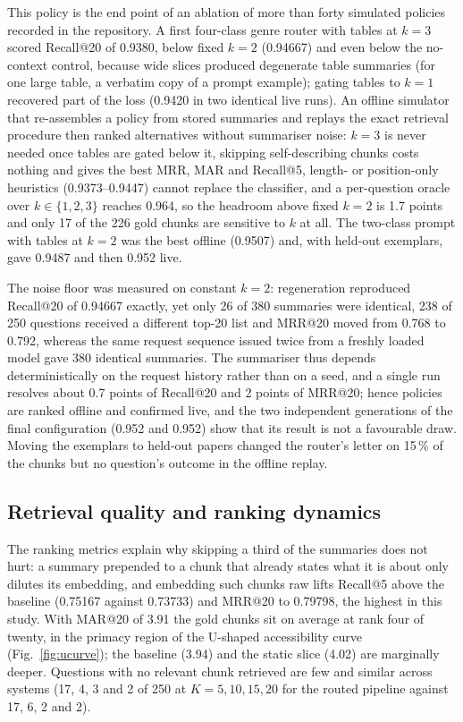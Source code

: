 \documentclass[pdflatex,sn-mathphys-num]{sn-jnl}
\makeatletter
\newcommand{\Rec}[1]{Recall@#1}
\newcommand{\MRR}[1]{MRR@#1}
\newcommand{\MAR}[1]{MAR@#1}
\theoremstyle{thmstyleone}%
\theoremstyle{thmstylethree}%
\makeatother
\begin{document}
This policy is the end point of an ablation of more than forty simulated policies recorded in the repository. A first four-class genre router with tables at $k=3$ scored \Rec{20} of 0.9380, below fixed $k=2$ (0.94667) and even below the no-context control, because wide slices produced degenerate table summaries (for one large table, a verbatim copy of a prompt example); gating tables to $k=1$ recovered part of the loss (0.9420 in two identical live runs). An offline simulator that re-assembles a policy from stored summaries and replays the exact retrieval procedure then ranked alternatives without summariser noise: $k=3$ is never needed once tables are gated below it, skipping self-describing chunks costs nothing and gives the best MRR, MAR and \Rec{5}, length- or position-only heuristics (0.9373--0.9447) cannot replace the classifier, and a per-question oracle over $k\in\{1,2,3\}$ reaches 0.964, so the headroom above fixed $k=2$ is 1.7 points and only 17 of the 226 gold chunks are sensitive to $k$ at all. The two-class prompt with tables at $k=2$ was the best offline (0.9507) and, with held-out exemplars, gave 0.9487 and then 0.952 live.

The noise floor was measured on constant $k=2$: regeneration reproduced \Rec{20} of 0.94667 exactly, yet only 26 of 380 summaries were identical, 238 of 250 questions received a different top-20 list and \MRR{20} moved from 0.768 to 0.792, whereas the same request sequence issued twice from a freshly loaded model gave 380 identical summaries. The summariser thus depends deterministically on the request history rather than on a seed, and a single run resolves about 0.7 points of \Rec{20} and 2 points of \MRR{20}; hence policies are ranked offline and confirmed live, and the two independent generations of the final configuration (0.952 and 0.952) show that its result is not a favourable draw. Moving the exemplars to held-out papers changed the router's letter on 15\,\% of the chunks but no question's outcome in the offline replay.

\subsection{Retrieval quality and ranking dynamics}\label{sec:ranking}

The ranking metrics explain why skipping a third of the summaries does not hurt: a summary prepended to a chunk that already states what it is about only dilutes its embedding, and embedding such chunks raw lifts \Rec{5} above the baseline (0.75167 against 0.73733) and \MRR{20} to 0.79798, the highest in this study. With \MAR{20} of 3.91 the gold chunks sit on average at rank four of twenty, in the primacy region of the U-shaped accessibility curve (Fig.~\ref{fig:ucurve}); the baseline (3.94) and the static slice (4.02) are marginally deeper. Questions with no relevant chunk retrieved are few and similar across systems (17, 4, 3 and 2 of 250 at $K=5,10,15,20$ for the routed pipeline against 17, 6, 2 and 2).
\end{document}
